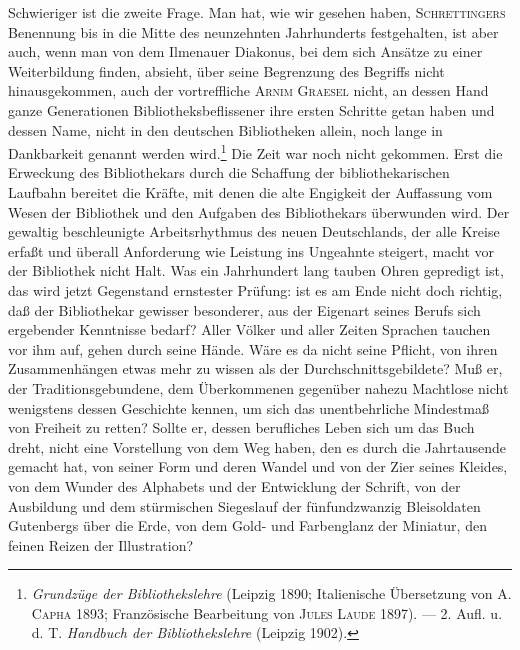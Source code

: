 \documentclass[a4paper,
fontsize=11pt,
oneside,
numbers=noperiodatend,
parskip=half-,
bibliography=totoc,
final
]{scrartcl}
\begin{document}
Schwieriger ist die zweite Frage. Man hat, wie wir gesehen haben,
\textsc{Schrettingers} Benennung bis in die Mitte des neunzehnten
Jahrhunderts festgehalten, ist aber auch, wenn man von dem Ilmenauer
Diakonus, bei dem sich Ansätze zu einer Weiterbildung finden, absieht,
über seine Begrenzung des Begriffs nicht hinausgekommen, auch der
vortreffliche \textsc{Arnim Graesel} nicht, an dessen Hand ganze
Generationen Bibliotheksbeflissener ihre ersten Schritte getan haben und
dessen Name, nicht in den deutschen Bibliotheken allein, noch lange in
Dankbarkeit genannt werden wird.\footnote{\emph{Grundzüge der
  Bibliothekslehre} (Leipzig 1890; Italienische Übersetzung von
  \textsc{A. Capha} 1893; Französische Bearbeitung von \textsc{Jules
  Laude} 1897). --- 2. Aufl. u. d. T. \emph{Handbuch der
  Bibliothekslehre} (Leipzig 1902).} Die Zeit war noch nicht gekommen.
Erst die Erweckung des Bibliothekars durch die Schaffung der
bibliothekarischen Laufbahn bereitet die Kräfte, mit denen die alte
Engigkeit der Auffassung vom Wesen der Bibliothek und den Aufgaben des
Bibliothekars überwunden wird. Der gewaltig beschleunigte
Arbeitsrhythmus des neuen Deutschlands, der alle Kreise erfaßt und
überall Anforderung wie Leistung ins Ungeahnte steigert, macht vor der
Bibliothek nicht Halt. Was ein Jahrhundert lang tauben Ohren gepredigt
ist, das wird jetzt Gegenstand ernstester Prüfung: ist es am Ende nicht
doch richtig, daß der Bibliothekar gewisser besonderer, aus der Eigenart
seines Berufs sich ergebender Kenntnisse bedarf? Aller Völker und aller
Zeiten Sprachen tauchen vor ihm auf, gehen durch seine Hände. Wäre es da
nicht seine Pflicht, von ihren Zusammenhängen etwas mehr zu wissen als
der Durchschnittsgebildete? Muß er, der Traditionsgebundene, dem
Überkommenen gegenüber nahezu Machtlose nicht wenigstens dessen
Geschichte kennen, um sich das unentbehrliche Mindestmaß von Freiheit zu
retten? Sollte er, dessen berufliches Leben sich um das Buch dreht,
nicht eine Vorstellung von dem Weg haben, den es durch die Jahrtausende
gemacht hat, von seiner Form und deren Wandel und von der Zier seines
Kleides, von dem Wunder des Alphabets und der Entwicklung der Schrift,
von der Ausbildung und dem stürmischen Siegeslauf der fünfundzwanzig
Bleisoldaten Gutenbergs über die Erde, von dem Gold- und Farbenglanz der
Miniatur, den feinen Reizen der Illustration?
\end{document}
